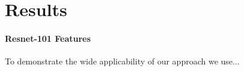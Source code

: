 \chapter{Results}
\subsubsection{Resnet-101 Features} \label{resnetbaseexplain}

To demonstrate the wide applicability of our approach we use...